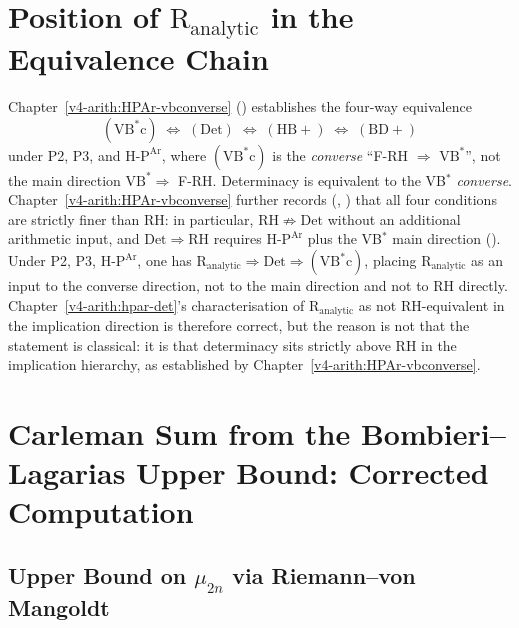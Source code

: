 \section{Position of \(\mathrm{R}_{\mathrm{analytic}}\) in the Equivalence Chain}
\label{v4-arith:r-audit:chain-position}

Chapter~\ref{v4-arith:HPAr-vbconverse}
()
establishes the four-way equivalence
\[
(\mathrm{VB^{*}c})\;\Leftrightarrow\;(\mathrm{Det})\;\Leftrightarrow\;
(\mathrm{HB+})\;\Leftrightarrow\;(\mathrm{BD+})
\]
under P2, P3, and \(\mathrm{H\text{-}P}^{\mathrm{Ar}}\), where
\((\mathrm{VB^{*}c})\) is the \emph{converse} ``F-RH
\(\Rightarrow\) \(\mathrm{VB}^{*}\)'', not the main direction
\(\mathrm{VB}^{*}\Rightarrow\) F-RH. Determinacy is equivalent to
the VB\(^{*}\) \emph{converse}. Chapter~\ref{v4-arith:HPAr-vbconverse}
further records
(,
) that all four
conditions are strictly finer than RH: in particular,
\(\mathrm{RH}\not\Rightarrow\mathrm{Det}\) without an additional
arithmetic input, and \(\mathrm{Det}\Rightarrow\mathrm{RH}\) requires
\(\mathrm{H\text{-}P}^{\mathrm{Ar}}\) plus the VB\(^{*}\) main direction
(). Under P2, P3,
\(\mathrm{H\text{-}P}^{\mathrm{Ar}}\), one has
\(\mathrm{R}_{\mathrm{analytic}}\Rightarrow\mathrm{Det}
\Rightarrow(\mathrm{VB^{*}c})\), placing
\(\mathrm{R}_{\mathrm{analytic}}\) as an input to the converse
direction, not to the main direction and not to RH directly.
Chapter~\ref{v4-arith:hpar-det}'s characterisation of
\(\mathrm{R}_{\mathrm{analytic}}\) as not RH-equivalent in the
implication direction is therefore correct, but the reason is not
that the statement is classical: it is that determinacy sits
strictly above RH in the implication hierarchy, as established by
Chapter~\ref{v4-arith:HPAr-vbconverse}.

\section{Carleman Sum from the Bombieri--Lagarias Upper Bound: Corrected Computation}
\label{v4-arith:r-audit:carleman-BL-explicit}

\subsection{Upper Bound on \(\mu_{2n}\) via Riemann--von Mangoldt}
\label{v4-arith:r-audit:upper-bound}

